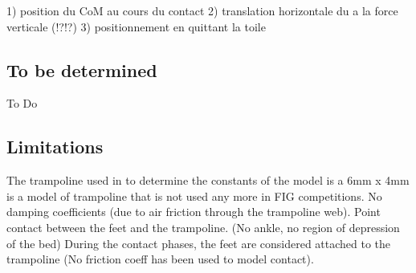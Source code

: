 
1) position du CoM au cours du contact \cite{lephartatiner}
2) translation horizontale du a la force verticale (!?!?)
3) positionnement en quittant la toile


\subsection{To be determined}\label{subsec:4a}
To Do


\subsection{Limitations}\label{subsec:4e}
The trampoline used in \cite{} to determine the constants of the model is a 6mm x 4mm is a model of trampoline that is not used any more in FIG competitions.
No damping coefficients (due to air friction through the trampoline web).
Point contact between the feet and the trampoline. (No ankle, no region of depression of the bed)
During the contact phases, the feet are considered attached to the trampoline (No friction coeff has been used to model contact).